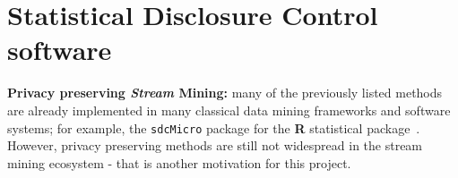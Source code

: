 \section{Statistical Disclosure Control software}
\label{State::SDC}



\textbf{Privacy preserving \textit{Stream} Mining:} many of the previously listed methods are already implemented in many classical data mining frameworks and software systems; for example, the \texttt{sdcMicro} package for the \textbf{R} statistical package~\cite{sdcMicro}. However, privacy preserving methods are still not widespread in the stream mining ecosystem - that is another motivation for this project.
